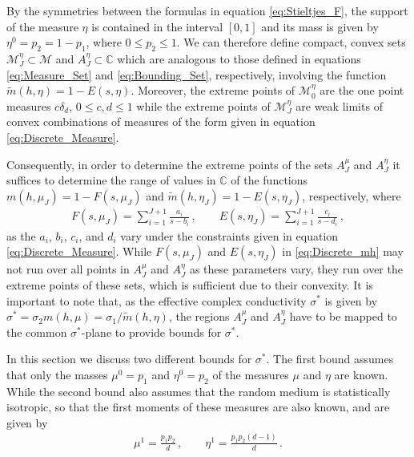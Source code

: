 \documentclass{cmslatex}
\begin{document}
By the symmetries between the formulas in equation
\eqref{eq:Stieltjes_F}, the support of the measure $\eta$ is contained in
the interval $[0,1]$ and its mass is given by $\eta^0=p_2=1-p_1$, where
$0\leq p_2\leq1$. We can therefore define compact, convex sets
$\mathscr{M}_J^\eta\subset\mathscr{M}$ and $A_J^\eta\subset\mathbb{C}$ which are
analogous to those defined in equations \eqref{eq:Measure_Set} and
\eqref{eq:Bounding_Set}, respectively, involving the function
$\tilde{m}(h,\eta)=1-E(s,\eta)$. Moreover, the extreme points of
$\mathscr{M}_0^\eta$ are the one point measures $c\delta_d$, $0\leq c,d\leq1$ 
while the extreme points of $\mathscr{M}_J^\eta$ are weak limits
of convex combinations of measures of the form given in equation
\eqref{eq:Discrete_Measure}. 



Consequently, in order to determine the extreme
points of the sets $A_J^\mu$ and $A_J^\eta$ it suffices to determine the
range of values in $\mathbb{C}$ of the functions $m(h,\mu_J)=1-F(s,\mu_J)$
and $\tilde{m}(h,\eta_J)=1-E(s,\eta_J)$, respectively, where  
%
\begin{align}\label{eq:Discrete_mh}
  F(s,\mu_J)=\sum_{i=1}^{J+1}\frac{a_i}{s-b_i}\,, \qquad
  E(s,\eta_J)=\sum_{i=1}^{J+1}\frac{c_i}{s-d_i}\,,
\end{align}
as the $a_i$, $b_i$, $c_i$, and $d_i$ vary under the
constraints given in equation  \eqref{eq:Discrete_Measure}. While
$F(s,\mu_J)$ and $E(s,\eta_J)$ in 
\eqref{eq:Discrete_mh} may not run over all points in $A_J^\mu$ and
$A_J^\eta$ as these parameters vary, they run over the
extreme points of these sets, which is sufficient due to their
convexity. It is important to note that, as the effective complex
conductivity $\sigma^*$ is given by $\sigma^*=\sigma_2m(h,\mu)=\sigma_1/\tilde{m}(h,\eta)$, the
regions $A_J^\mu$ and $A_J^\eta$ have to be mapped to the common
$\sigma^*$-plane to provide bounds for $\sigma^*$.    





In this section we discuss two different bounds for $\sigma^*$. The first
bound assumes that only the masses $\mu^0=p_1$ and $\eta^0=p_2$ of the
measures $\mu$ and $\eta$ are known. While the second bound also assumes
that the random medium is statistically isotropic, so that the first
moments of these measures are also known, and are given by
\cite{Golden:JMPS-333}   
%
\begin{align}\label{eq:First_Moments}
  \mu^1=\frac{p_1p_2}{d}\,, \qquad
  \eta^1=\frac{p_1p_2(d-1)}{d}\,.
\end{align}
%
\end{document}
